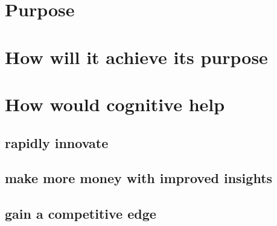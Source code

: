 \documentclass{article}
\begin{document}
\section{Purpose}

\section{How will it achieve its purpose}

\section{How would cognitive help}
\subsection{rapidly innovate}

\subsection{make more money with improved insights}

\subsection{gain a competitive edge}
\end{document}
